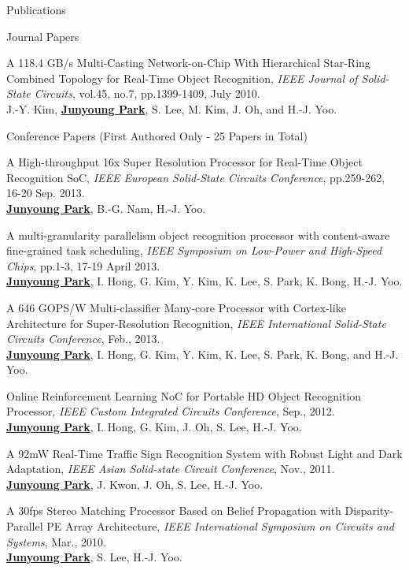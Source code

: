 \documentclass{resume} %
\begin{document}
\begin{section}{Publications}
\begin{subsection}{Journal Papers}{}{}{}
\item A 118.4 GB/s Multi-Casting Network-on-Chip With Hierarchical Star-Ring Combined Topology for Real-Time Object Recognition, \emph{IEEE Journal of Solid-State Circuits}, vol.45, no.7, pp.1399-1409, July 2010. \\
J.-Y. Kim, \underline{\bf Junyoung Park}, S. Lee, M. Kim, J. Oh, and H.-J. Yoo.

\end{subsection}

\begin{subsection}{Conference Papers (First Authored Only - 25 Papers in Total)}{}{}{}

\item A High-throughput 16x Super Resolution Processor for Real-Time Object Recognition SoC, \emph{IEEE European Solid-State Circuits Conference}, pp.259-262, 16-20 Sep. 2013. \\
\underline{\bf Junyoung Park}, B.-G. Nam, H.-J. Yoo.

\item A multi-granularity parallelism object recognition processor with content-aware fine-grained task scheduling, \emph{IEEE Symposium on Low-Power and High-Speed Chips}, pp.1-3, 17-19 April 2013. \\
\underline{\bf Junyoung Park}, I. Hong, G. Kim, Y. Kim, K. Lee, S. Park, K. Bong, H.-J. Yoo.

\item A 646 GOPS/W Multi-classifier Many-core Processor with Cortex-like Architecture for Super-Resolution Recognition, \emph{IEEE International Solid-State Circuits Conference}, Feb., 2013. \\
\underline{\bf Junyoung Park}, I. Hong, G. Kim, Y. Kim, K. Lee, S. Park, K. Bong, and H.-J. Yoo.

\item Online Reinforcement Learning NoC for Portable HD Object Recognition Processor, \emph{IEEE Custom Integrated Circuits Conference}, Sep., 2012. \\
\underline{\bf Junyoung Park}, I. Hong, G. Kim, J. Oh, S. Lee, H.-J. Yoo.

\item A 92mW Real-Time Traffic Sign Recognition System with Robust Light and Dark Adaptation, \emph{IEEE Asian Solid-state Circuit Conference}, Nov., 2011. \\
\underline{\bf Junyoung Park}, J. Kwon, J. Oh, S. Lee, H.-J. Yoo.

\item A 30fps Stereo Matching Processor Based on Belief Propagation with Disparity-Parallel PE Array Architecture, \emph{IEEE International Symposium on Circuits and Systems}, Mar., 2010. \\
\underline{\bf Junyoung Park}, S. Lee, H.-J. Yoo.


\end{subsection}
\end{section}
\end{document}
